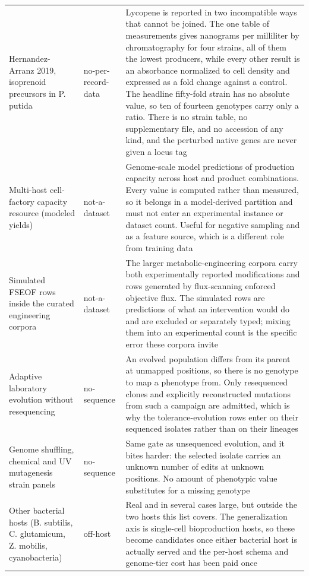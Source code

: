 \begin{longtable}{@{}L{58mm} L{28mm} L{83mm}@{}}
\addlinespace[5pt]
Hernandez-Arranz 2019, isoprenoid precursors in P. putida & no-per-record-data & Lycopene is reported in two incompatible ways that cannot be joined. The one table of measurements gives nanograms per milliliter by chromatography for four strains, all of them the lowest producers, while every other result is an absorbance normalized to cell density and expressed as a fold change against a control. The headline fifty-fold strain has no absolute value, so ten of fourteen genotypes carry only a ratio. There is no strain table, no supplementary file, and no accession of any kind, and the perturbed native genes are never given a locus tag \\
\addlinespace[5pt]
Multi-host cell-factory capacity resource (modeled yields) & not-a-dataset & Genome-scale model predictions of production capacity across host and product combinations. Every value is computed rather than measured, so it belongs in a model-derived partition and must not enter an experimental instance or dataset count. Useful for negative sampling and as a feature source, which is a different role from training data \\
\addlinespace[5pt]
Simulated FSEOF rows inside the curated engineering corpora & not-a-dataset & The larger metabolic-engineering corpora carry both experimentally reported modifications and rows generated by flux-scanning enforced objective flux. The simulated rows are predictions of what an intervention would do and are excluded or separately typed; mixing them into an experimental count is the specific error these corpora invite \\
\addlinespace[5pt]
Adaptive laboratory evolution without resequencing & no-sequence & An evolved population differs from its parent at unmapped positions, so there is no genotype to map a phenotype from. Only resequenced clones and explicitly reconstructed mutations from such a campaign are admitted, which is why the tolerance-evolution rows enter on their sequenced isolates rather than on their lineages \\
\addlinespace[5pt]
Genome shuffling, chemical and UV mutagenesis strain panels & no-sequence & Same gate as unsequenced evolution, and it bites harder: the selected isolate carries an unknown number of edits at unknown positions. No amount of phenotypic value substitutes for a missing genotype \\
\addlinespace[5pt]
Other bacterial hosts (B. subtilis, C. glutamicum, Z. mobilis, cyanobacteria) & off-host & Real and in several cases large, but outside the two hosts this list covers. The generalization axis is single-cell bioproduction hosts, so these become candidates once either bacterial host is actually served and the per-host schema and genome-tier cost has been paid once \\

\end{longtable}
